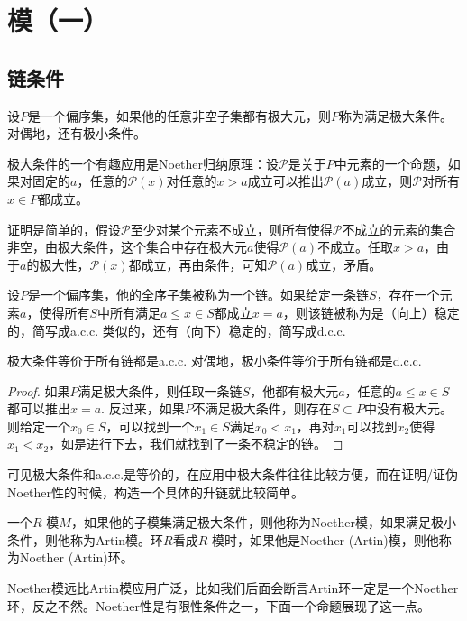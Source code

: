 
\chapter{模（一）}

\section{链条件}

\para 设$P$是一个偏序集，如果他的任意非空子集都有极大元，则$P$称为满足极大条件。对偶地，还有极小条件。

极大条件的一个有趣应用是Noether归纳原理：设$\mathcal{P}$是关于$P$中元素的一个命题，如果对固定的$a$，任意的$\mathcal{P}(x)$对任意的$x>a$成立可以推出$\mathcal{P}(a)$成立，则$\mathcal{P}$对所有$x\in P$都成立。

证明是简单的，假设$\mathcal{P}$至少对某个元素不成立，则所有使得$\mathcal{P}$不成立的元素的集合非空，由极大条件，这个集合中存在极大元$a$使得$\mathcal{P}(a)$不成立。任取$x>a$，由于$a$的极大性，$\mathcal{P}(x)$都成立，再由条件，可知$\mathcal{P}(a)$成立，矛盾。

\para 设$P$是一个偏序集，他的全序子集被称为一个链。如果给定一条链$S$，存在一个元素$a$，使得所有$S$中所有满足$a\leq x\in S$都成立$x=a$，则该链被称为是（向上）稳定的，简写成a.c.c. 类似的，还有（向下）稳定的，简写成d.c.c.

\begin{pro}
极大条件等价于所有链都是a.c.c. 对偶地，极小条件等价于所有链都是d.c.c.
\end{pro}

\begin{proof}
	如果$P$满足极大条件，则任取一条链$S$，他都有极大元$a$，任意的$a\leq x\in S$都可以推出$x=a$. 反过来，如果$P$不满足极大条件，则存在$S\subset P$中没有极大元。则给定一个$x_0\in S$，可以找到一个$x_1\in S$满足$x_0<x_1$，再对$x_1$可以找到$x_2$使得$x_1<x_2$，如是进行下去，我们就找到了一条不稳定的链。
\end{proof}

可见极大条件和a.c.c.是等价的，在应用中极大条件往往比较方便，而在证明/证伪Noether性的时候，构造一个具体的升链就比较简单。

\para 一个$R$-模$M$，如果他的子模集满足极大条件，则他称为Noether模，如果满足极小条件，则他称为Artin模。环$R$看成$R$-模时，如果他是Noether (Artin)模，则他称为Noether (Artin)环。

Noether模远比Artin模应用广泛，比如我们后面会断言Artin环一定是一个Noether环，反之不然。Noether性是有限性条件之一，下面一个命题展现了这一点。

